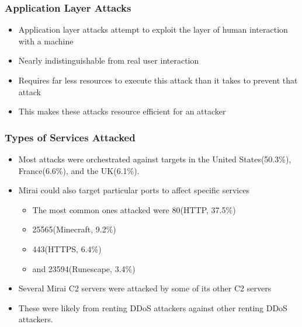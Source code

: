 \documentclass{beamer}
\begin{document}
\begin{frame}
    \frametitle{Application Layer Attacks}
        \begin{itemize}
            \item Application layer attacks attempt to exploit the layer of human interaction with a machine
            \item Nearly indistinguishable from real user interaction
            \item Requires far less resources to execute this attack than it takes to prevent that attack
            \item This makes these attacks resource efficient for an attacker
    \end{itemize}
\end{frame}

\begin{frame}
    \frametitle{Types of Services Attacked}
    \begin{itemize}
        \item Most attacks were orchestrated against targets in the United States(50.3\%), France(6.6\%), and the UK(6.1\%).
        \item Mirai could also target particular ports to affect specific services
        \begin{itemize}
        		\item The most common ones attacked were 80(HTTP, 37.5\%)
        		\item 25565(Minecraft, 9.2\%)
        		\item 443(HTTPS, 6.4\%)
        		\item and 23594(Runescape, 3.4\%)
        \end{itemize}
        \item Several Mirai C2 servers were attacked by some of its other C2 servers
        \item These were likely from renting DDoS attackers against other renting DDoS attackers.
    \end{itemize}
\end{frame}
\end{document}
